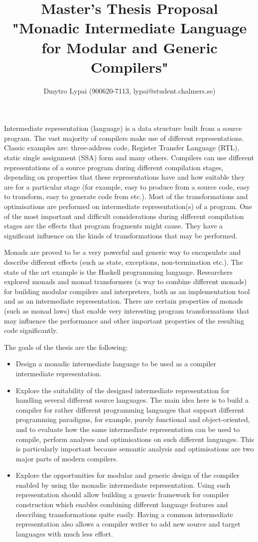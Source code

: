\documentclass{article}
\title{Master's Thesis Proposal\\ "Monadic Intermediate Language for Modular and Generic Compilers"}
\author{Dmytro Lypai (900620-7113, lypai@student.chalmers.se)}
\begin{document}
\maketitle

Intermediate representation (language) is a data structure built from a source program.
The vast majority of compilers make use of different representations.
Classic examples are: three-address code, Register Transfer Language (RTL), static single assignment (SSA) form and many others.
Compilers can use different representations of a source program during different compilation stages, depending on properties that
these representations have and how suitable they are for a particular stage (for example, easy to produce from a source code,
easy to transform, easy to generate code from etc.).
Most of the transformations and optimisations are performed on intermediate representation(s) of a program.
One of the most important and difficult considerations during different compilation stages are the effects that program fragments
might cause. They have a significant influence on the kinds of transformations that may be performed.

Monads are proved to be a very powerful and generic way to encapsulate and describe different effects
(such as state, exceptions, non-termination etc.). The state of the art example is the Haskell programming language.
Researchers explored monads and monad transformers (a way to combine different monads) for building modular compilers and interpreters,
both as an implementation tool and as an intermediate representation.
There are certain properties of monads (such as monad laws) that enable very interesting program transformations
that may influence the performance and other important properties of the resulting code significantly.

The goals of the thesis are the following:
\begin{itemize}
  \item Design a monadic intermediate language to be used as a compiler intermediate representation.
  \item Explore the suitability of the designed intermediate representation for handling several different source languages.
    The main idea here is to build a compiler for rather different programming languages that support different programming
    paradigms, for example, purely functional and object-oriented, and to evaluate how the same intermediate representation
    can be used to compile, perform analyses and optimisations on such different languages.
    This is particularly important because semantic analysis and optimisations are two major parts of modern compilers.
  \item Explore the opportunities for modular and generic design of the compiler enabled by using the monadic intermediate representation.
    Using such representation should allow building a generic framework for compiler construction which enables
    combining different language features and describing transformations quite easily. Having a common intermediate representation
    also allows a compiler writer to add new source and target languages with much less effort.
\end{itemize}
\end{document}
